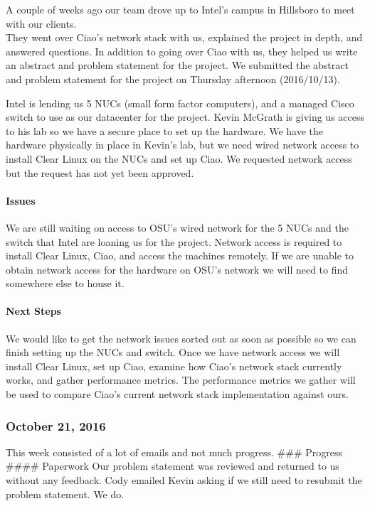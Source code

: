 \documentclass[10pt,onecolumn,journal,draftclsnofoot]{IEEEtran}
\begin{document}
A couple of weeks ago our team drove up to Intel's campus in Hillsboro
to meet with our clients.\\
They went over Ciao's network stack with us, explained the project in
depth, and answered questions. In addition to going over Ciao with us,
they helped us write an abstract and problem statement for the project.
We submitted the abstract and problem statement for the project on
Thursday afternoon (2016/10/13).

Intel is lending us 5 NUCs (small form factor computers), and a managed
Cisco switch to use as our datacenter for the project. Kevin McGrath is
giving us access to his lab so we have a secure place to set up the
hardware. We have the hardware physically in place in Kevin's lab, but
we need wired network access to install Clear Linux on the NUCs and set
up Ciao. We requested network access but the request has not yet been
approved.

\paragraph{Issues} 

We are still waiting on access to OSU's wired network for the 5 NUCs and
the switch that Intel are loaning us for the project. Network access is
required to install Clear Linux, Ciao, and access the machines remotely.
If we are unable to obtain network access for the hardware on OSU's
network we will need to find somewhere else to house it.

\paragraph{Next Steps} 

We would like to get the network issues sorted out as soon as possible
so we can finish setting up the NUCs and switch. Once we have network
access we will install Clear Linux, set up Ciao, examine how Ciao's
network stack currently works, and gather performance metrics. The
performance metrics we gather will be used to compare Ciao's current
network stack implementation against ours.

\subsubsection{October 21, 2016} 

This week consisted of a lot of emails and not much progress. \#\#\#
Progress \#\#\#\# Paperwork Our problem statement was reviewed and
returned to us without any feedback. Cody emailed Kevin asking if we
still need to resubmit the problem statement. We do.
\end{document}
